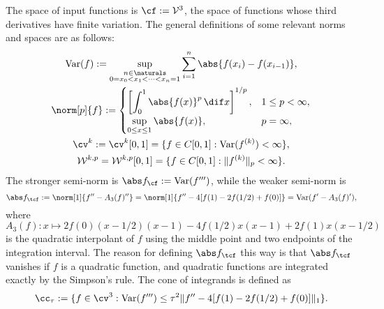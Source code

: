 The space of input functions is $\cf:=\mathcal{V}^{3}$, the space of functions whose third derivatives have finite variation.  The general definitions of some relevant norms and spaces are as follows:
\begin{subequations} \label{defSobolev}
\begin{gather}
\Var(f) := \sup_{\substack{n \in \naturals\\ 0 = x_0 < x_1 < \cdots < x_{n} =1}} \sum_{i=1}^n \abs{f(x_i)-f(x_{i-1})}, \\
\norm[p]{f}:= \begin{cases} \displaystyle \left[\int_0^1 \abs{f(x)}^p \, \dif x \right]^{1/p}, & 1 \le p < \infty,\\[1ex]
\displaystyle  \sup_{0 \le x \le 1} \abs{f(x)}, & p=\infty,
\end{cases}
\\
\cv^{k}: =\cv^{k}[0,1]=\{f\in C[0,1]: \Var(f^{(k)}) < \infty \}, \\
\mathcal{W}^{k,p}=\mathcal{W}^{k,p}[0,1]=\{f\in C[0,1]: \|f^{(k)}\|_{p}<\infty\}.
\end{gather}
\end{subequations}
The stronger semi-norm is $\Fnorm{f}:=\Var(f''')$, while the weaker semi-norm is
\[
\Ftnorm{f}:=\norm[1]{f''-A_3(f)''}=\norm[1]{f''-4[f(1)-2f(1/2)+f(0)]}=\Var(f'-A_3(f)'),
\]
where $A_3(f): x \mapsto 2f(0)(x-1/2)(x-1)-4f(1/2)x(x-1)+2f(1)x(x-1/2)$ is the quadratic interpolant of $f$ using the middle point and two endpoints of the integration interval. The reason for defining $\Ftnorm{f}$ this way is that $\Ftnorm{f}$ vanishes if $f$ is a quadratic function, and quadratic functions are integrated exactly by the Simpson's rule.  The cone of integrands is defined as
\begin{equation}\label{coneinteg}
\cc_{\tau}:=\{f\in \cv^{3}:\Var(f''')\leq\tau^2\|f''-4[f(1)-2f(1/2)+f(0)]\|_1\}.
\end{equation}

